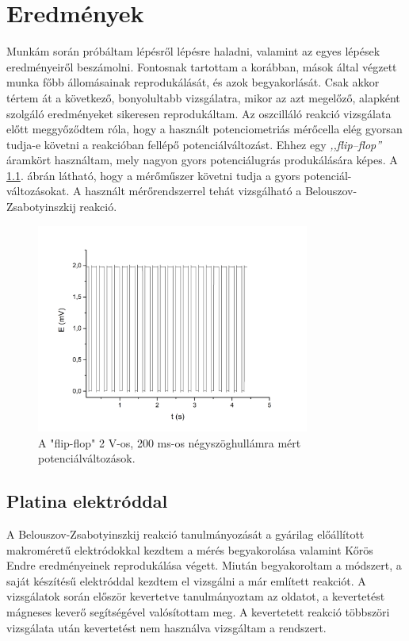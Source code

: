 \chapter{Eredmények}
\pagestyle{headings}

\def\s{0.5}
Munkám során próbáltam lépésről lépésre haladni, valamint az egyes lépések eredményeiről beszámolni. Fontosnak tartottam a korábban, mások által végzett munka főbb állomásainak reprodukálását, és azok begyakorlását. Csak akkor tértem át a következő, bonyolultabb vizsgálatra, mikor az azt megelőző, alapként szolgáló eredményeket sikeresen reprodukáltam. Az oszcilláló reakció vizsgálata előtt meggyőződtem róla, hogy a használt potenciometriás mérőcella elég gyorsan tudja-e követni a reakcióban fellépő potenciálváltozást. Ehhez egy \emph{,,flip--flop''} áramkört használtam, mely nagyon gyors potenciálugrás produkálására képes. A \ref{fig:square}. ábrán látható, hogy a mérőműszer követni tudja a gyors potenciál-változásokat. A használt mérőrendszerrel tehát vizsgálható a Belouszov-Zsabotyinszkij reakció.

\begin{figure}
\centering
\includegraphics[width=0.8\textwidth]{img/square.jpg}
\caption{A "flip-flop" 2 V-os, 200 ms-os négyszöghullámra mért potenciálváltozások.}
\label{fig:square}
\end{figure}

\section{Platina elektróddal}
A Belouszov-Zsabotyinszkij reakció tanulmányozását a gyárilag előállított makroméretű elektródokkal kezdtem a mérés begyakorolása valamint Kőrös Endre eredményeinek \cite{noyes1972oscillations} reprodukálása végett. Miután begyakoroltam a módszert, a saját készítésű elektróddal kezdtem el vizsgálni a már említett reakciót. A vizsgálatok során először kevertetve tanulmányoztam az oldatot, a kevertetést mágneses keverő segítségével valósítottam meg. A kevertetett reakció többszöri vizsgálata után kevertetést nem használva vizsgáltam a rendszert.

